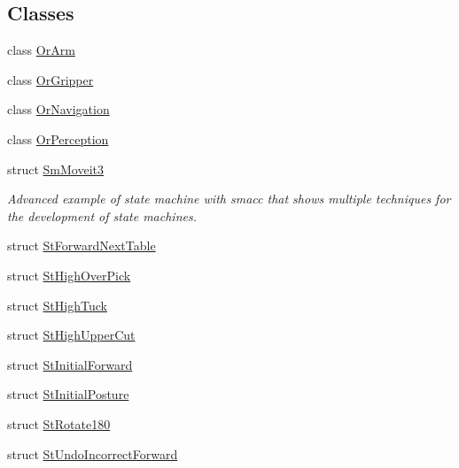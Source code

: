 \subsection*{Classes}
\begin{DoxyCompactItemize}
\item 
class \hyperlink{classsm__moveit__3_1_1OrArm}{Or\+Arm}
\item 
class \hyperlink{classsm__moveit__3_1_1OrGripper}{Or\+Gripper}
\item 
class \hyperlink{classsm__moveit__3_1_1OrNavigation}{Or\+Navigation}
\item 
class \hyperlink{classsm__moveit__3_1_1OrPerception}{Or\+Perception}
\item 
struct \hyperlink{structsm__moveit__3_1_1SmMoveit3}{Sm\+Moveit3}
\begin{DoxyCompactList}\small\item\em Advanced example of state machine with smacc that shows multiple techniques for the development of state machines. \end{DoxyCompactList}\item 
struct \hyperlink{structsm__moveit__3_1_1StForwardNextTable}{St\+Forward\+Next\+Table}
\item 
struct \hyperlink{structsm__moveit__3_1_1StHighOverPick}{St\+High\+Over\+Pick}
\item 
struct \hyperlink{structsm__moveit__3_1_1StHighTuck}{St\+High\+Tuck}
\item 
struct \hyperlink{structsm__moveit__3_1_1StHighUpperCut}{St\+High\+Upper\+Cut}
\item 
struct \hyperlink{structsm__moveit__3_1_1StInitialForward}{St\+Initial\+Forward}
\item 
struct \hyperlink{structsm__moveit__3_1_1StInitialPosture}{St\+Initial\+Posture}
\item 
struct \hyperlink{structsm__moveit__3_1_1StRotate180}{St\+Rotate180}
\item 
struct \hyperlink{structsm__moveit__3_1_1StUndoIncorrectForward}{St\+Undo\+Incorrect\+Forward}
\end{DoxyCompactItemize}
